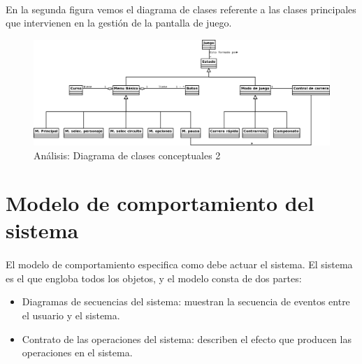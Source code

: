 \paragraph{}
En la segunda figura vemos el diagrama de clases referente a las clases principales que intervienen en la gestión de la pantalla
de juego.

\begin{figure}[H]
  \label{diagrama_clases_conceptuales}
  \begin{center}
    \includegraphics[scale=0.35]{imagenes/analisis/diagrama_clases_conceptuales1.png}
  \end{center}
  \caption{Análisis: Diagrama de clases conceptuales 2}
\end{figure}

\section{Modelo de comportamiento del sistema}

\paragraph{}
El modelo de comportamiento especifica como debe actuar el sistema. El sistema es el que engloba todos los objetos, y el modelo
consta de dos partes:

\begin{itemize}
    \item Diagramas de secuencias del sistema: muestran la secuencia de eventos entre el usuario y el sistema.
    \item Contrato de las operaciones del sistema: describen el efecto que producen las operaciones en el sistema.
\end{itemize}


